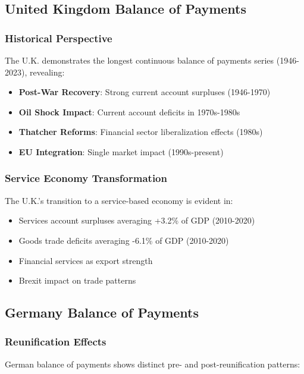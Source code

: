 \documentclass[11pt,a4paper]{article}
\begin{document}
\subsection{United Kingdom Balance of Payments}

\subsubsection{Historical Perspective}
The U.K. demonstrates the longest continuous balance of payments series (1946-2023), revealing:

\begin{itemize}
    \item \textbf{Post-War Recovery}: Strong current account surpluses (1946-1970)
    \item \textbf{Oil Shock Impact}: Current account deficits in 1970s-1980s
    \item \textbf{Thatcher Reforms}: Financial sector liberalization effects (1980s)
    \item \textbf{EU Integration}: Single market impact (1990s-present)
\end{itemize}

\subsubsection{Service Economy Transformation}
The U.K.'s transition to a service-based economy is evident in:
\begin{itemize}
    \item Services account surpluses averaging +3.2\% of GDP (2010-2020)
    \item Goods trade deficits averaging -6.1\% of GDP (2010-2020)
    \item Financial services as export strength
    \item Brexit impact on trade patterns
\end{itemize}

\subsection{Germany Balance of Payments}

\subsubsection{Reunification Effects}
German balance of payments shows distinct pre- and post-reunification patterns:
\end{document}
